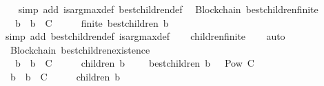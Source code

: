 \begin{isabellebody}
%
\isadelimproof
\ \ %
\endisadelimproof
%
\isatagproof
{}\isamarkupfalse%
\ {\isacharparenleft}simp\ add{\isacharcolon}\ is{\isacharunderscore}arg{\isacharunderscore}max{\isacharunderscore}def\ best{\isacharunderscore}children{\isacharunderscore}def{\isacharparenright}%
\endisatagproof
{\isafoldproof}%
%
\isadelimproof
\isanewline
%
\endisadelimproof
\isanewline
{}\isamarkupfalse%
\ {\isacharparenleft}\ Blockchain{\isacharparenright}\ best{\isacharunderscore}children{\isacharunderscore}finite\ {\isacharcolon}\isanewline
\ \ {\isachardoublequoteopen}{\isasymforall}\ b\ {\isasymsigma}{\isachardot}\ b\ {\isasymin}\ C\ {\isasymand}\ {\isasymsigma}\ {\isasymin}\ {\isasymSigma}\ {\isasymlongrightarrow}\ finite\ {\isacharparenleft}best{\isacharunderscore}children\ {\isacharparenleft}b{\isacharcomma}\ {\isasymsigma}{\isacharparenright}{\isacharparenright}{\isachardoublequoteclose}\isanewline
%
\isadelimproof
\ \ %
\endisadelimproof
%
\isatagproof
{}\isamarkupfalse%
\ {\isacharparenleft}simp\ add{\isacharcolon}\ best{\isacharunderscore}children{\isacharunderscore}def\ is{\isacharunderscore}arg{\isacharunderscore}max{\isacharunderscore}def{\isacharparenright}\isanewline
\ \ \isamarkupfalse%
\ children{\isacharunderscore}finite\isanewline
\ \ \isamarkupfalse%
\ auto%
\endisatagproof
{\isafoldproof}%
%
\isadelimproof
\isanewline
%
\endisadelimproof
\ \isanewline
{}\isamarkupfalse%
\ {\isacharparenleft}\ Blockchain{\isacharparenright}\ best{\isacharunderscore}children{\isacharunderscore}existence\ {\isacharcolon}\isanewline
\ \ {\isachardoublequoteopen}{\isasymforall}\ b\ {\isasymsigma}{\isachardot}\ b\ {\isasymin}\ C\ {\isasymand}\ {\isasymsigma}\ {\isasymin}\ {\isasymSigma}\ {\isasymlongrightarrow}\ children\ {\isacharparenleft}b{\isacharcomma}\ {\isasymsigma}{\isacharparenright}\ {\isasymnoteq}\ {\isasymemptyset}\ {\isasymlongrightarrow}\ best{\isacharunderscore}children\ {\isacharparenleft}b{\isacharcomma}\ {\isasymsigma}{\isacharparenright}\ {\isasymin}\ Pow\ C\ {\isacharminus}\ {\isacharbraceleft}{\isasymemptyset}{\isacharbraceright}{\isachardoublequoteclose}\ \ \ \ \isanewline
%
\isadelimproof
%
\endisadelimproof
%
\isatagproof
{}\isamarkupfalse%
\ {\isacharminus}\isanewline
\ \ \isamarkupfalse%
\ {\isachardoublequoteopen}{\isasymforall}\ b\ {\isasymsigma}{\isachardot}\ b\ {\isasymin}\ C\ {\isasymand}\ {\isasymsigma}\ {\isasymin}\ {\isasymSigma}\ {\isasymlongrightarrow}\ children\ {\isacharparenleft}b{\isacharcomma}\ {\isasymsigma}{\isacharparenright}\ {\isasymnoteq}\ {\isasymemptyset}\ \isanewline

\end{isabellebody}
